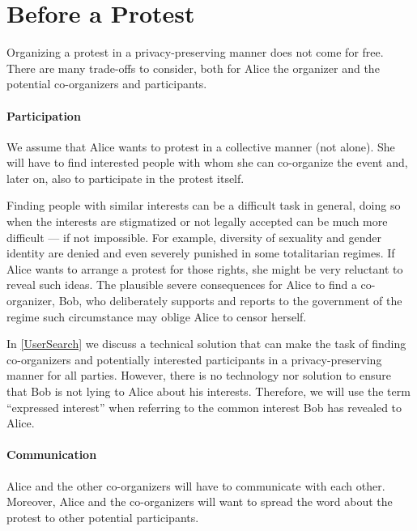 \section{Before a Protest}
\label{BeforeProtest}

Organizing a protest in a privacy-preserving manner does not come for free.  
There are many trade-offs to consider, both for Alice the organizer and the 
potential co-organizers and participants.

\paragraph{Participation}

We assume that Alice wants to protest in a collective manner (not alone).
She will have to find interested people with whom she can co-organize the event
and, later on, also to participate in the protest itself.

Finding people with similar interests can be a difficult task in general, doing 
so when the interests are stigmatized or not legally accepted can be much more 
difficult --- if not impossible.
For example, diversity of sexuality and gender identity are denied and even 
severely punished in some totalitarian regimes.
If Alice wants to arrange a protest for those rights, she might be very 
reluctant to reveal such ideas.
The plausible severe consequences for Alice to find a co-organizer, Bob, who 
deliberately supports and reports to the government of the regime such 
circumstance may oblige Alice to censor herself. 

In \cref{UserSearch} we discuss a technical solution that can make the task of 
finding co-organizers and potentially interested participants in 
a privacy-preserving manner for all parties.
However, there is no technology nor solution to ensure that Bob is not lying to 
Alice about his interests.
Therefore, we will use the term \enquote{expressed interest} when referring to 
the common interest Bob has revealed to Alice.

\paragraph{Communication}

Alice and the other co-organizers will have to communicate with each other.
Moreover, Alice and the co-organizers will want to spread the word about the 
protest to other potential participants.

